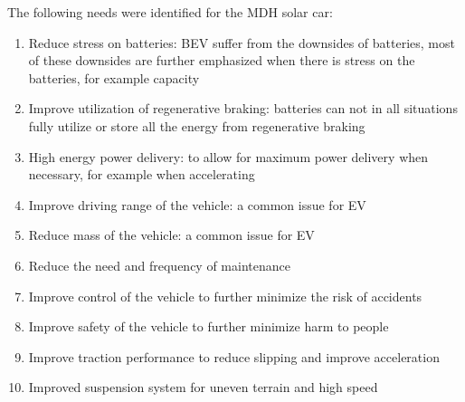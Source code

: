 The following needs were identified for the MDH solar car:
\begin{enumerate}
	\item Reduce stress on batteries: BEV suffer from the downsides of batteries, most of these downsides are further emphasized when there is stress on the batteries, for example capacity\:\cite{khajepourElectricHybridVehicles2014}
	\item Improve utilization of regenerative braking: batteries can not in all situations fully utilize or store all the energy from regenerative braking\:\cite{khajepourElectricHybridVehicles2014}
	\item High energy power delivery: to allow for maximum power delivery when necessary, for example when accelerating
	\item Improve driving range of the vehicle: a common issue for EV\:\cite{khajepourElectricHybridVehicles2014}\cite{othaganontMultiobjectiveOptimisationBattery2017}
	\item Reduce mass of the vehicle: a common issue for EV\:\cite{khajepourElectricHybridVehicles2014}
	\item Reduce the need and frequency of maintenance
	\item Improve control of the vehicle to further minimize the risk of accidents
	\item Improve safety of the vehicle to further minimize harm to people
	\item Improve traction performance to reduce slipping and improve acceleration
	\item Improved suspension system for uneven terrain and high speed
\end{enumerate}


